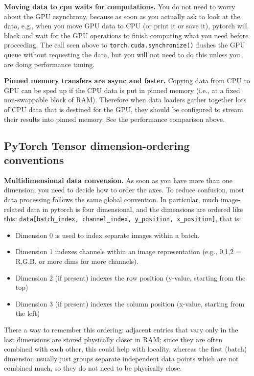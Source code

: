 \textbf{Moving data to cpu waits for computations.} You do not need to worry about the GPU asynchrony, because as soon as you actually ask to look at the data, e.g., when you move GPU data to CPU (or print it or save it), pytorch will block and wait for the GPU operations to finish computing what you need before proceeding. The call seen above to \texttt{torch.cuda.synchronize()} flushes the GPU queue without requesting the data, but you will not need to do this unless you are doing performance timing.

\textbf{Pinned memory transfers are async and faster.} Copying data from CPU to GPU can be sped up if the CPU data is put in pinned memory (i.e., at a fixed non-swappable block of RAM).  Therefore when data loaders gather together lots of CPU data that is destined for the GPU, they should be configured to stream their results into pinned memory. See the performance comparison above.

\subsection{PyTorch Tensor dimension-ordering conventions}

\textbf{Multidimensional data convension.} As soon as you have more than one dimension, you need to decide how to order the axes.  To reduce confusion, most data processing follows the same global convention. In particular, much image-related data in pytorch is four dimensional, and the dimensions are ordered like this: \texttt{data[batch\_index, channel\_index, y\_position, x\_position]}, that is:
\begin{itemize}
    \item Dimension 0 is used to index separate images within a batch.
    \item Dimension 1 indexes channels within an image representation (e.g., 0,1,2 = R,G,B, or more dims for more channels).
    \item Dimension 2 (if present) indexes the row position (y-value, starting from the top)
    \item Dimension 3 (if present) indexes the column position (x-value, starting from the left)
\end{itemize}

There a way to remember this ordering: adjacent entries that vary only in the last dimensions are stored physically closer in RAM; since they are often combined with each other, this could help with locality, whereas the first (batch) dimension usually just groups separate independent data points which are not combined much, so they do not need to be physically close.

